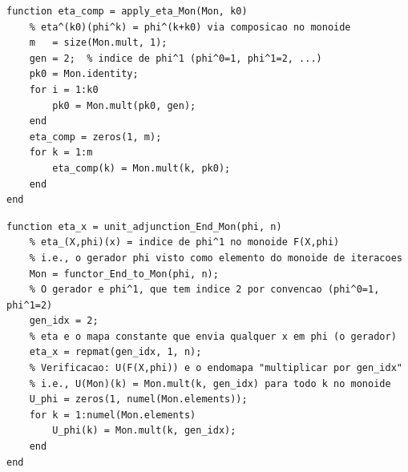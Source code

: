 \begin{lstlisting}[style=matlab, caption={Transformação natural $\eta^{(k_0)}: F \Rightarrow F$ (translação por $k_0$)}]
function eta_comp = apply_eta_Mon(Mon, k0)
    % eta^(k0)(phi^k) = phi^(k+k0) via composicao no monoide
    m   = size(Mon.mult, 1);
    gen = 2;  % indice de phi^1 (phi^0=1, phi^1=2, ...)
    pk0 = Mon.identity;
    for i = 1:k0
        pk0 = Mon.mult(pk0, gen);
    end
    eta_comp = zeros(1, m);
    for k = 1:m
        eta_comp(k) = Mon.mult(k, pk0);
    end
end
\end{lstlisting}

\begin{lstlisting}[style=matlab, caption={Unidade da adjunção $\eta: \mathrm{Id}_{\mathbf{End}} \Rightarrow U \circ F$ --- componente em $(X,\varphi)$}]
function eta_x = unit_adjunction_End_Mon(phi, n)
    % eta_(X,phi)(x) = indice de phi^1 no monoide F(X,phi)
    % i.e., o gerador phi visto como elemento do monoide de iteracoes
    Mon = functor_End_to_Mon(phi, n);
    % O gerador e phi^1, que tem indice 2 por convencao (phi^0=1, phi^1=2)
    gen_idx = 2;
    % eta e o mapa constante que envia qualquer x em phi (o gerador)
    eta_x = repmat(gen_idx, 1, n);
    % Verificacao: U(F(X,phi)) e o endomapa "multiplicar por gen_idx"
    % i.e., U(Mon)(k) = Mon.mult(k, gen_idx) para todo k no monoide
    U_phi = zeros(1, numel(Mon.elements));
    for k = 1:numel(Mon.elements)
        U_phi(k) = Mon.mult(k, gen_idx);
    end
end
\end{lstlisting}
